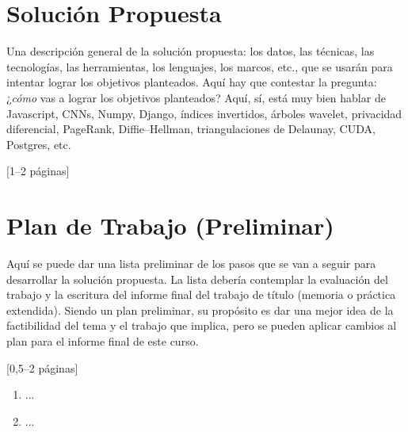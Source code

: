 \documentclass[guia]{upropuesta}
\begin{document}
\section{Solución Propuesta}\label{sec:sol}

\begin{pauta}
Una descripción general de la solución propuesta: los datos, las técnicas, las tecnologías, las herramientas, los lenguajes, los marcos, etc., que se usarán para intentar lograr los objetivos planteados. Aquí hay que contestar la pregunta: ¿\textit{cómo} vas a lograr los objetivos planteados? Aquí, sí, está muy bien hablar de Javascript, CNNs, Numpy, Django, índices invertidos, árboles wavelet, privacidad diferencial, PageRank, Diffie--Hellman, triangulaciones de Delaunay, CUDA, Postgres, etc.

[1--2 páginas]
\end{pauta}


\section{Plan de Trabajo (Preliminar)}\label{sec:pdt}

\begin{pauta}
Aquí se puede dar una lista preliminar de los pasos que se van a seguir para desarrollar la solución propuesta. La lista debería contemplar la evaluación del trabajo y la escritura del informe final del trabajo de título (memoria o práctica extendida). Siendo un plan preliminar, su propósito es dar una mejor idea de la factibilidad del tema y el trabajo que implica, pero se pueden aplicar cambios al plan para el informe final de este curso.

[0,5--2 páginas]
\end{pauta}

\begin{enumerate}
\item ...
\item ...
\end{enumerate}



\end{document}
